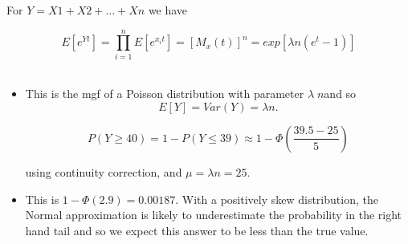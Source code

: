 \documentclass[a4paper,12pt]{article}
\begin{document}
\begin{enumerate}
For $Y = X1 + X2 + … + Xn$ we have

\[E[e^{Yt}] = \prod^{n}_{i=1}E[e^{x_it}] = [M_x(t)]^n = exp[\lambda n(e^t-1)]\]




\begin{itemize}
\item This is the mgf of a Poisson distribution with parameter $\lambda\;n$and so 
\[E[Y] = Var(Y) = \lambda n.\]

\[P (Y \geq 40) = 1- P(Y \leq 39) \approx 1 - \Phi(\frac{39.5-25}{5})\]

using continuity correction, and $\mu = \lambda n = 25$. 
\item This is $1-\Phi(2.9) = 0.00187$.
With a positively skew distribution, the Normal approximation is likely to
underestimate the probability in the right hand tail and so we expect this answer to be
less than the true value.
\end{itemize}
\end{enumerate}
\end{document}

